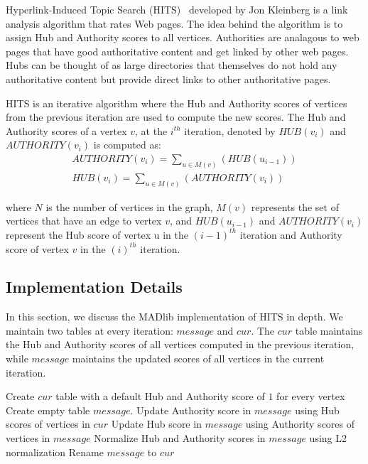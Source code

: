 Hyperlink-Induced Topic Search (HITS)~\cite{hits} developed by Jon Kleinberg is
a link analysis algorithm that rates Web pages. The idea behind the algorithm is
to assign Hub and Authority scores to all vertices. Authorities are analagous to
web pages that have good authoritative content and get linked by other web pages.
Hubs can be thought of as large directories that themselves do not hold any
authoritative content but provide direct links to other authoritative pages.

HITS is an iterative algorithm where the Hub and Authority scores of vertices
from the previous iteration are used to compute the new scores. The
Hub and Authority scores of a vertex $v$, at the $i^{th}$ iteration, denoted by
$HUB(v_i)$ and $AUTHORITY(v_i)$ is computed as:
\begin{equation}
    \begin{aligned}
        AUTHORITY(v_i) = \sum_{u \in M(v)}({HUB(u_{i-1})})\\
        HUB(v_i) = \sum_{u \in M(v)}({AUTHORITY(v_{i})})
    \end{aligned}
\label{eq:hits}
\end{equation}

where $N$ is the number of vertices in the graph, $M(v)$ represents the set of
vertices that have an edge to vertex $v$, and $HUB(u_{i-1})$ and $AUTHORITY
(v_{i})$ represent the Hub score of vertex {u} in the $(i-1) ^{th}$ iteration and
Authority score of vertex $v$ in the $(i)^{th}$ iteration.

\subsection{Implementation Details} \label{sec:hits:implementation}

In this section, we discuss the MADlib implementation of HITS in depth.
We maintain two tables at every iteration: $message$ and $cur$. The
$cur$ table maintains the Hub and Authority scores of all vertices
computed in the previous iteration, while $message$ maintains the updated scores
of all vertices in the current iteration.

\begin{algorithm}[HITS$(V,E)$] \label{alg:hits:high}
\begin{algorithmic}[1]
	\State Create $cur$ table with a default Hub and Authority score of
			${1}$ for every vertex
	\Repeat
        \State Create empty table $message$.
        \State Update Authority score in $message$ using Hub scores of vertices
        in $cur$
        \State Update Hub score in $message$ using Authority scores of vertices
        in $message$
        \State Normalize Hub and Authority scores in $message$ using L2
        normalization
        \State Rename $message$ to $cur$
\end{algorithmic}
\end{algorithm}

